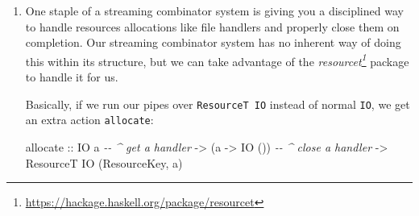 \documentclass[]{article}
\newenvironment{Shaded}{}{}
\newcommand{\CommentTok}[1]{\textcolor[rgb]{0.38,0.63,0.69}{\textit{#1}}}
\newcommand{\DataTypeTok}[1]{\textcolor[rgb]{0.56,0.13,0.00}{#1}}
\newcommand{\NormalTok}[1]{#1}
\newcommand{\OtherTok}[1]{\textcolor[rgb]{0.00,0.44,0.13}{#1}}
\renewcommand{\href}[2]{#2\footnote{\url{#1}}}
\begin{document}
\begin{enumerate}
  We could then write pre-map and post-map function on \texttt{PipeF} and
  translate them to \texttt{Pipe} using \texttt{transFreeT}:

\begin{Shaded}
\begin{Highlighting}[]
\CommentTok{{-}{-} source: https://github.com/mstksg/inCode/tree/master/code{-}samples/misc/streaming{-}combinators{-}free.hs\#L118{-}L130}

\OtherTok{postMapF ::}\NormalTok{ (o }\OtherTok{{-}>}\NormalTok{ o\textquotesingle{}) }\OtherTok{{-}>} \DataTypeTok{PipeF}\NormalTok{ i o a }\OtherTok{{-}>} \DataTypeTok{PipeF}\NormalTok{ i o\textquotesingle{} a}

\OtherTok{preMapF ::}\NormalTok{ (i\textquotesingle{} }\OtherTok{{-}>}\NormalTok{ i) }\OtherTok{{-}>} \DataTypeTok{PipeF}\NormalTok{ i o a }\OtherTok{{-}>} \DataTypeTok{PipeF}\NormalTok{ i\textquotesingle{} o a}

\OtherTok{postMap ::} \DataTypeTok{Monad}\NormalTok{ m }\OtherTok{=>}\NormalTok{ (o }\OtherTok{{-}>}\NormalTok{ o\textquotesingle{}) }\OtherTok{{-}>} \DataTypeTok{Pipe}\NormalTok{ i o m a }\OtherTok{{-}>} \DataTypeTok{Pipe}\NormalTok{ i o\textquotesingle{} m a}
\NormalTok{postMap f }\OtherTok{=}\NormalTok{ transFreeT (postMapF f)}

\OtherTok{preMap ::} \DataTypeTok{Monad}\NormalTok{ m }\OtherTok{=>}\NormalTok{ (i\textquotesingle{} }\OtherTok{{-}>}\NormalTok{ i) }\OtherTok{{-}>} \DataTypeTok{Pipe}\NormalTok{ i o m a }\OtherTok{{-}>} \DataTypeTok{Pipe}\NormalTok{ i\textquotesingle{} o m a}
\NormalTok{preMap f }\OtherTok{=}\NormalTok{ transFreeT (preMapF f)}
\end{Highlighting}
\end{Shaded}
\item
  One staple of a streaming combinator system is giving you a disciplined way to
  handle resources allocations like file handlers and properly close them on
  completion. Our streaming combinator system has no inherent way of doing this
  within its structure, but we can take advantage of the
  \emph{\href{https://hackage.haskell.org/package/resourcet}{resourcet}} package
  to handle it for us.

  Basically, if we run our pipes over \texttt{ResourceT\ IO} instead of normal
  \texttt{IO}, we get an extra action \texttt{allocate}:

\begin{Shaded}
\begin{Highlighting}[]
\NormalTok{allocate}
\OtherTok{    ::} \DataTypeTok{IO}\NormalTok{ a             }\CommentTok{{-}{-} \^{} get a handler}
    \OtherTok{{-}>}\NormalTok{ (a }\OtherTok{{-}>} \DataTypeTok{IO}\NormalTok{ ())     }\CommentTok{{-}{-} \^{} close a handler}
    \OtherTok{{-}>} \DataTypeTok{ResourceT} \DataTypeTok{IO}\NormalTok{ (}\DataTypeTok{ResourceKey}\NormalTok{, a)}


\end{Highlighting}
\end{Shaded}
\end{enumerate}
\end{document}
